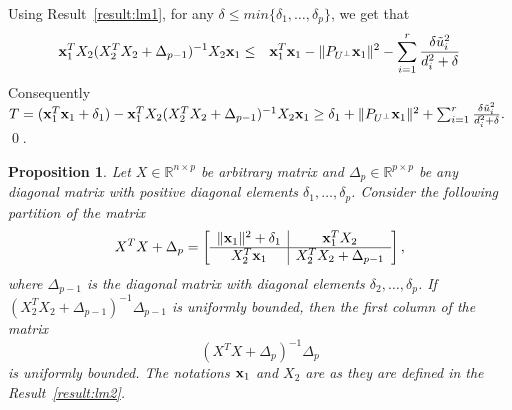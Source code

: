 \documentclass[noinfoline,11pt]{imsart}
\numberwithin{equation}{section}
\theoremstyle{plain}
\newtheorem{prop}{Proposition}[section]
\newcommand{\lmDelta}{\Delta}
\newcommand{\lmdelta}{\delta}
\newcommand{\lmX}{X}
\newcommand{\lmu}{u}
\newcommand{\R}{\mathbb{R}}
\newcommand{\norm}[1]{ \Vert #1 \Vert }
\newcommand{\lmxbf}{{\bf x}}
\begin{document}
\proof
 Using Result~\ref{result:lm1},  for any $\lmdelta\leq min\{ \lmdelta_1, \ldots, \lmdelta_p \}$, we get that  
\begin{eqnarray}
 \lmxbf_1^T \lmX_2 (\lmX_{2}^T\lmX_2+\lmDelta_{p-1})^{-1}\lmX_2\lmxbf_1
& \leq & \lmxbf_1^T\lmxbf_1-\norm{P_{U^\perp}\lmxbf_1}^2-\sum_{i=1}^{r} \frac{\lmdelta\tilde{\lmu}^2_i}{d_i^2+\lmdelta}\nonumber
\end{eqnarray}
Consequently $T= (\lmxbf_1^T\lmxbf_1+\lmdelta_1)- \lmxbf_1^T \lmX_2 (\lmX_{2}^T\lmX_2+\lmDelta_{p-1})^{-1}\lmX_2\lmxbf_1\geq \lmdelta_1+\norm{P_{U^\perp}\lmxbf_1}^2+\sum_{i=1}^{r} \frac{\lmdelta\tilde{\lmu}^2_i}{d_i^2+\lmdelta}.$
\qed.
 \vspace{.25in}
 
 
 
\begin{prop} \label{result:lm2.1}
Let $\lmX\in \R^{n\times p}$ be arbitrary matrix and $\lmDelta_p\in \R^{p\times p}$ be any diagonal matrix with positive diagonal elements $\lmdelta_1, \ldots, \lmdelta_p$.  Consider the following partition of the matrix  
$$\lmX^T\lmX+\lmDelta_p=\left[
\begin{array}{c|c}
\norm{\lmxbf_{1}}^2+\lmdelta_1 &     \lmxbf_1^T\lmX_2 \\ \hline
  \lmX_2^T\lmxbf_1 &\lmX_2^T\lmX_2+\lmDelta_{p-1}
\end{array}\right],$$
 where $\lmDelta_{p-1}$ is the diagonal matrix with diagonal elements $\lmdelta_2, \ldots, \lmdelta_p$. If  $(\lmX_2^T\lmX_2+\lmDelta_{p-1})^{-1}\lmDelta_{p-1}$ is uniformly bounded, then the first column of the matrix 
$$  \left( \lmX^T\lmX+\lmDelta_p \right)^{-1}\lmDelta_p $$ is uniformly bounded. The notations $\lmxbf_1$ and $ \lmX_2$ are as they are defined  in the Result~\ref{result:lm2}.
\end{prop}  
 
\end{document}
